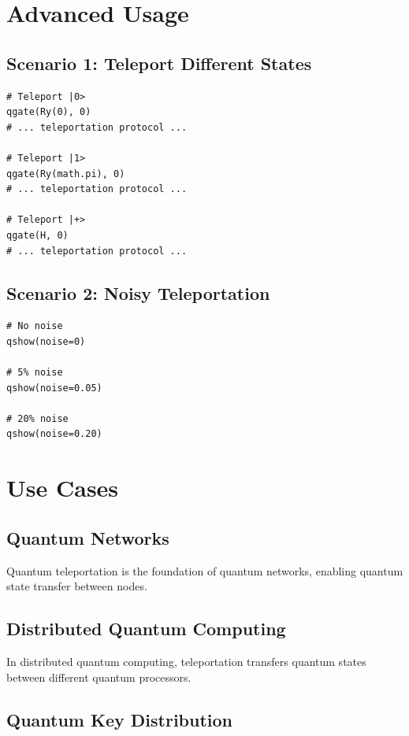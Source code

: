 \documentclass[12pt,a4paper]{article}
\begin{document}
\section{Advanced Usage}

\subsection{Scenario 1: Teleport Different States}

\begin{verbatim}
# Teleport |0>
qgate(Ry(0), 0)
# ... teleportation protocol ...

# Teleport |1>
qgate(Ry(math.pi), 0)
# ... teleportation protocol ...

# Teleport |+>
qgate(H, 0)
# ... teleportation protocol ...
\end{verbatim}

\subsection{Scenario 2: Noisy Teleportation}

\begin{verbatim}
# No noise
qshow(noise=0)

# 5% noise
qshow(noise=0.05)

# 20% noise
qshow(noise=0.20)
\end{verbatim}

\section{Use Cases}

\subsection{Quantum Networks}

Quantum teleportation is the foundation of quantum networks, enabling quantum state transfer between nodes.

\subsection{Distributed Quantum Computing}

In distributed quantum computing, teleportation transfers quantum states between different quantum processors.

\subsection{Quantum Key Distribution}
\end{document}
